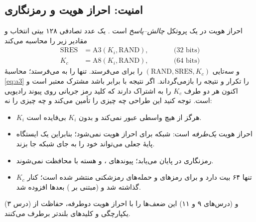 \documentclass[11pt,a4paper]{article}
\begin{document}
\subsection{امنیت: احراز هویت و رمزنگاری}
احراز هویت در  یک پروتکل \emph{چالش--پاسخ} است \cite{ts43020}.  یک عدد
تصادفی ۱۲۸ بیتی  انتخاب و مقادیر زیر را محاسبه می‌کند
\begin{subequations}\label{eq:a3a8}
\begin{align}
  \text{SRES} &= \mathrm{A3}(K_i,\text{RAND}), \qquad &&\text{(32 bits)} \label{eq:a3}\\
  K_c &= \mathrm{A8}(K_i,\text{RAND}), \qquad &&\text{(64 bits)} \label{eq:a8}
\end{align}
\end{subequations}
و سه‌تایی $(\text{RAND},\text{SRES},K_c)$ را برای  می‌فرستد.  تنها
 را به  می‌فرستد؛  محاسبهٔ \cref{eq:a3} را تکرار و نتیجه را
بازمی‌گرداند. اگر نتیجه با  برابر باشد مشترک معتبر است و اکنون هر دو طرف $K_c$ را
به اشتراک دارند که کلید رمز جریانی  روی پیوند رادیویی است. توجه کنید این طراحی
چه چیزی را تأمین می‌کند و چه چیزی را نه:
\begin{itemize}
  \item $K_i$ هرگز از هیچ واسطی عبور نمی‌کند و  بدون $K_i$ بی‌فایده است.
  \item احراز هویت \emph{یک‌طرفه} است: شبکه برای  احراز هویت نمی‌شود؛ بنابراین
        یک ایستگاه پایهٔ جعلی می‌تواند خود را به جای شبکه جا بزند.
  \item رمزنگاری در  پایان می‌یابد؛ پیوندهای ،  و هسته با
         محافظت نمی‌شوند.
  \item $K_c$ تنها ۶۴ بیت دارد و برای رمزهای  و  حمله‌های رمزشکنی
        منتشر شده است؛  کنار گذاشته شد و  (مبتنی بر )
        بعدها افزوده شد.
\end{itemize}
 (درس ۳) و  (درس‌های ۹ و ۱۱) این ضعف‌ها را با احراز هویت دوطرفه،
حفاظت از یکپارچگی و کلیدهای بلندتر برطرف می‌کنند.
\end{document}

